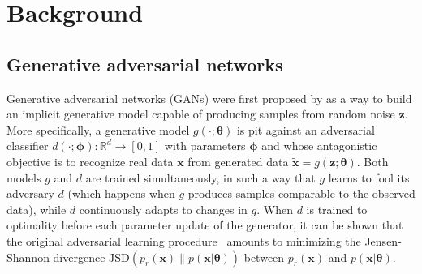 \documentclass{article}
\newcommand{\bftheta}{{\bm \theta}}
\newcommand{\bfphi}{{\bm \phi}}
\newcommand{\bfz}{\mathbf{z}}
\theoremstyle{plain}
\begin{document}

\section{Background}

\subsection{Generative adversarial networks}
\label{sec:gans}

Generative adversarial networks (GANs) were first proposed by
\cite{goodfellow2014generative} as a way to build an implicit generative model
capable of producing samples from random noise $\bfz$. More specifically,
a generative model $g(\cdot; \bftheta)$ is pit against an adversarial
classifier $d(\cdot; \bfphi):\mathbb{R}^d \to [0,1]$ with parameters $\bfphi$ and whose antagonistic objective is to recognize real data $\mathbf{x}$
from generated data $\tilde{\mathbf{x}} = g(\bfz; \bftheta)$. Both models $g$ and $d$
are trained simultaneously, in such a way that $g$ learns to fool
its adversary $d$ (which happens when $g$ produces samples comparable to the
observed data), while $d$ continuously adapts to changes in $g$. When $d$ is
trained to optimality before each parameter update of the generator, it can
be shown that the original adversarial learning procedure~\cite{goodfellow2014generative} amounts to minimizing
the Jensen-Shannon divergence $\text{JSD}(p_r(\mathbf{x}) \parallel p(\mathbf{x}|\bftheta))$ between $p_r(\mathbf{x})$ and $p(\mathbf{x}|\bftheta)$.
\end{document}
